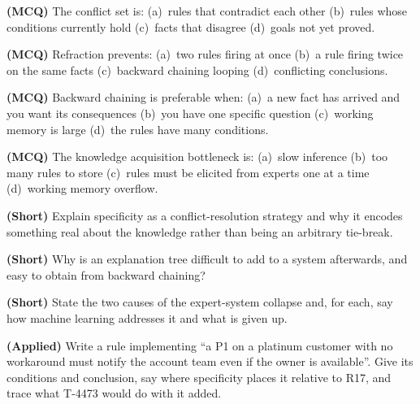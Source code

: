 \begin{reviewq}
  \item \textbf{(MCQ)} The conflict set is: (a)~rules that contradict each other
        (b)~rules whose conditions currently hold (c)~facts that disagree
        (d)~goals not yet proved.
  \item \textbf{(MCQ)} Refraction prevents: (a)~two rules firing at once
        (b)~a rule firing twice on the same facts (c)~backward chaining looping
        (d)~conflicting conclusions.
  \item \textbf{(MCQ)} Backward chaining is preferable when:
        (a)~a new fact has arrived and you want its consequences
        (b)~you have one specific question (c)~working memory is large
        (d)~the rules have many conditions.
  \item \textbf{(MCQ)} The knowledge acquisition bottleneck is:
        (a)~slow inference (b)~too many rules to store (c)~rules must be elicited
        from experts one at a time (d)~working memory overflow.
  \item \textbf{(Short)} Explain specificity as a conflict-resolution strategy and
        why it encodes something real about the knowledge rather than being an
        arbitrary tie-break.
  \item \textbf{(Short)} Why is an explanation tree difficult to add to a system
        afterwards, and easy to obtain from backward chaining?
  \item \textbf{(Short)} State the two causes of the expert-system collapse and,
        for each, say how machine learning addresses it and what is given up.
  \item \textbf{(Applied)} Write a rule implementing ``a P1 on a platinum customer
        with no workaround must notify the account team even if the owner is
        available''. Give its conditions and conclusion, say where specificity
        places it relative to R17, and trace what T-4473 would do with it added.
\end{reviewq}
